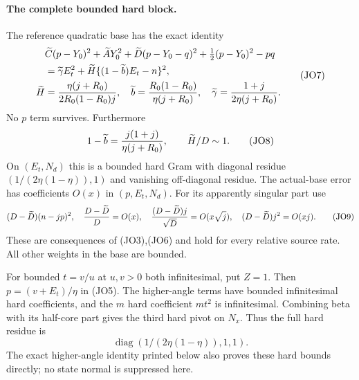 \paragraph{The complete bounded hard block.}
The reference quadratic base has the exact identity
\[
 \begin{aligned}
 &\widetilde C(p-Y_0)^2+\widetilde A Y_0^2+
 \widetilde D(p-Y_0-q)^2+\tfrac12(p-Y_0)^2-pq\\
 &=\widetilde\gamma E_t^2+
 \widetilde H\{(1-\widetilde b)E_t-n\}^2,               \\
 \widetilde H&={\eta(j+R_0)\over2R_0(1-R_0)j},\quad
 \widetilde b={R_0(1-R_0)\over\eta(j+R_0)},\quad
 \widetilde\gamma={1+j\over2\eta(j+R_0)} .
 \end{aligned} \tag{JO7}
\]
No $p$ term survives. Furthermore
\[
 1-\widetilde b={j(1+j)\over\eta(j+R_0)},\qquad
 \widetilde H/D\sim1.                                 \tag{JO8}
\]
On $(E_t,N_d)$ this is a bounded hard Gram with diagonal residue
$(1/(2\eta(1-\eta)),1)$ and vanishing off-diagonal residue.
The actual-base error has coefficients $O(x)$ in $(p,E_t,N_d)$.
For its apparently singular part use
\[
 (D-\widetilde D)(n-jp)^2,\quad
 {D-\widetilde D\over D}=O(x),\quad
 {(D-\widetilde D)j\over\sqrt D}=O(x\sqrt j),\quad
 (D-\widetilde D)j^2=O(xj).                           \tag{JO9}
\]
These are consequences of (JO3),(JO6) and hold for every relative
source rate. All other weights in the base are bounded.

For bounded $t=v/u$ at $u,v>0$ both infinitesimal, put $Z=1$.
Then $p=(v+E_t)/\eta$ in (JO5). The higher-angle terms have
bounded infinitesimal hard coefficients, and the $m$ hard coefficient
$m t^2$ is infinitesimal. Combining beta with its half-core part gives
the third hard pivot on $N_x$. Thus the full hard residue is
\[
                 \operatorname{diag}(1/(2\eta(1-\eta)),1,1).
                                                               \tag{JO10}
\]
The exact higher-angle identity printed below also proves these hard
bounds directly; no state normal is suppressed here.


